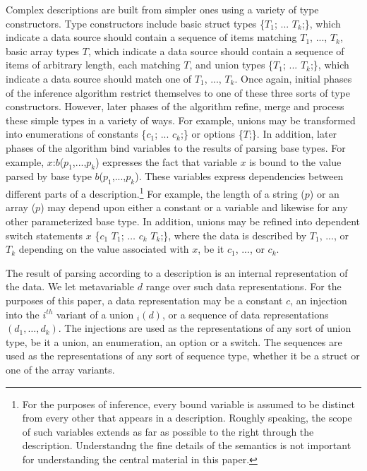 Complex descriptions are built from simpler ones using a variety of
type constructors.  Type constructors include
basic struct types \{$T_1$; ... $T_k$;\}, which indicate a
data source
should contain a sequence of items matching $T_1$, ..., $T_k$,
basic array types  $T$, which indicate a data source should contain
a sequence of items of arbitrary length, each matching $T$,
and union types  \{$T_1$; ... $T_k$;\}, which indicate a
data source
should match one of $T_1$, ..., $T_k$.  Once again, initial phases
of the inference algorithm restrict themselves to one of these three
sorts of type constructors.  However, later phases of the algorithm
refine, merge and process these simple types in a variety of ways.
For example, unions may be transformed into 
enumerations of constants
 \{$c_1$; ... $c_k$;\}
or options  \{$T$;\}.  In
addition, later phases of the algorithm 
bind variables to the results of parsing 
base types.  For example, $x$:$b$($p_1$,...,$p_k$) expresses the fact that
variable $x$ is bound to the value parsed by base type
$b$($p_1$,...,$p_k$).  These variables express dependencies between 
different parts
of a description.\footnote{For the purposes of inference, 
every bound variable is assumed to be distinct
from every other that appears in a description.  Roughly speaking,
the scope of such variables
extends as far as possible to the right through the description.
Understandng the fine details of the semantics is not important
for understanding the central material in this paper.}  
For example, the length of a string ($p$)
or an array ($p$) may depend upon either a constant or
a variable and likewise for any other parameterized base type.  In
addition, unions may be refined into dependent switch statements
 $x$  \{$c_1$ \cd{=>} $T_1$; $\ldots$ $c_k$ \cd{=>} $T_k$;\}, where the
data is described by $T_1$, ..., or $T_k$ depending on the value
associated with $x$, be it $c_1$, ..., or $c_k$.

The result of parsing according to a description is an internal
representation of the data. We let metavariable $d$ range over such 
data representations.  For the purposes of this paper, a data 
representation may be a constant $c$, an injection into the $i^{th}$
variant of a union $_i(d)$, or a sequence of data representations
$(d_1,\ldots,d_k)$.  The injections are used as the representations of
any sort of union type, be it a union, an enumeration, an option or a switch.
The sequences are used as the representations of any sort of sequence
type, whether it be a struct or one of the array variants.

